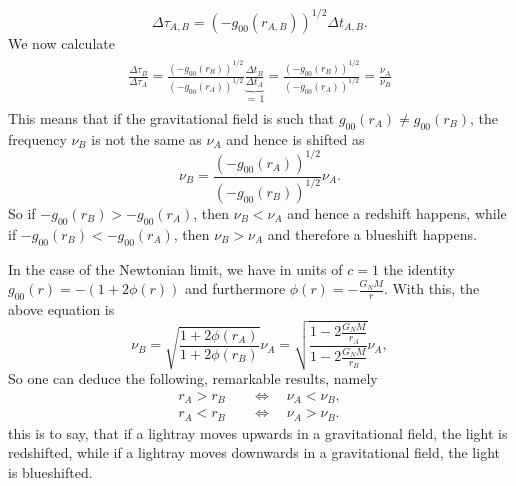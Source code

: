 \documentclass[a4paper,11pt]{article}
\numberwithin{equation}{section}
\begin{document}
{\begin{equation}
\Delta \tau_{A,B} = \left(-g_{00}(r_{A,B})\right)^{1/2}\Delta t_{A,B}.
\end{equation} We now calculate \begin{align}
\begin{aligned}
\frac{\Delta \tau_{B}}{\Delta \tau_{A}} = \frac{(-g_{00}(r_B))^{1/2}}{(-g_{00}(r_A))^{1/2}}  \underbrace{\frac{\Delta t_B}{\Delta t_A}}_{=\,1} = \frac{(-g_{00}(r_B))^{1/2}}{(-g_{00}(r_A))^{1/2}} = \frac{\nu_A}{\nu_B}
\end{aligned}
\end{align} This means that if the gravitational field is such that $g_{00}(r_A) \neq g_{00}(r_B)$, the frequency $\nu_B$ is not the same as $\nu_A$ and hence is shifted as \begin{equation}
\nu_B = \frac{(-g_{00}(r_A))^{1/2}}{(-g_{00}(r_B))^{1/2}}\nu_A.
\end{equation} So if $-g_{00}(r_B) > -g_{00}(r_A)$, then $\nu_B < \nu_A$ and hence a redshift happens, while if $-g_{00}(r_B) < -g_{00}(r_A)$, then $\nu_B > \nu_A$ and therefore a blueshift happens.

In the case of the Newtonian limit, we have in units of $c=1$ the identity $g_{00}(r) = -(1+2\phi(r))$ and furthermore $\phi(r) = -\frac{G_N M}{r}$. With this, the above equation is
\begin{equation}
\nu_B = \sqrt{\frac{1+2\phi(r_A)}{1+2\phi(r_B)}}\nu_A = \sqrt{\frac{1-2\frac{G_N M}{r_A}}{1-2\frac{G_N M}{r_B}}}\nu_A,
\end{equation} So one can deduce the following, remarkable results, namely
\begin{align}
r_A > r_B \quad &\Leftrightarrow \quad \nu_A < \nu_B, \\
r_A < r_B \quad &\Leftrightarrow \quad \nu_A > \nu_B.
\end{align} this is to say, that if a lightray moves upwards in a gravitational field, the light is redshifted, while if a lightray moves downwards in a gravitational field, the light is blueshifted.
}
\end{document}
